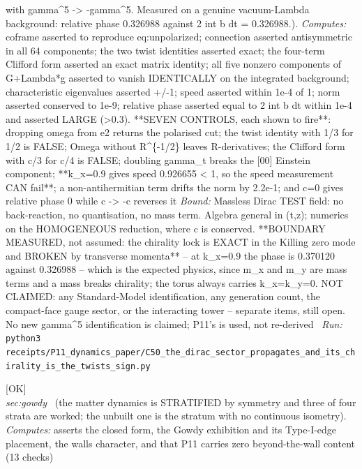 \begin{description}
with gamma\textasciicircum{}5 -> -gamma\textasciicircum{}5. Measured on a genuine vacuum-Lambda background: relative phase 0.326988 against 2 int b dt = 0.326988.). 
\emph{Computes:} coframe asserted to reproduce eq:unpolarized; connection asserted antisymmetric in all 64 components; the two twist identities asserted exact; the four-term Clifford form asserted an exact matrix identity; all five nonzero components of G+Lambda*g asserted to vanish IDENTICALLY on the integrated background; characteristic eigenvalues asserted +/-1; speed asserted within 1e-4 of 1; norm asserted conserved to 1e-9; relative phase asserted equal to 2 int b dt within 1e-4 and asserted LARGE (>0.3). **SEVEN CONTROLS, each shown to fire**: dropping omega from e2 returns the polarised cut; the twist identity with 1/3 for 1/2 is FALSE; Omega without R\textasciicircum{}\{-1/2\} leaves R-derivatives; the Clifford form with c/3 for c/4 is FALSE; doubling gamma\_t breaks the [00] Einstein component; **k\_x=0.9 gives speed 0.926655 < 1, so the speed measurement CAN fail**; a non-antihermitian term drifts the norm by 2.2e-1; and c=0 gives relative phase 0 while c -> -c reverses it
 \emph{Bound:} Massless Dirac TEST field: no back-reaction, no quantisation, no mass term. Algebra general in (t,z); numerics on the HOMOGENEOUS reduction, where c is conserved. **BOUNDARY MEASURED, not assumed: the chirality lock is EXACT in the Killing zero mode and BROKEN by transverse momenta** -- at k\_x=0.9 the phase is 0.370120 against 0.326988 -- which is the expected physics, since m\_x and m\_y are mass terms and a mass breaks chirality; the torus always carries k\_x=k\_y=0. NOT CLAIMED: any Standard-Model identification, any generation count, the compact-face gauge sector, or the interacting tower -- separate items, still open. No new gamma\textasciicircum{}5 identification is claimed; P11's is used, not re-derived
\ \emph{Run:} \texttt{python3 receipts/P11\_dynamics\_paper/C50\_the\_dirac\_sector\_propagates\_and\_its\_chirality\_is\_the\_twists\_sign.py}
\item[\label{rcpt:I2_the_stratification_three_of_four_are_worked}\textbf{}\quad\texttt{I2\_the\_stratification\_three\_of\_four\_are\_worked}]\hfill\textsf{[OK]}\\
\textit{sec:gowdy} \ (the matter dynamics is STRATIFIED by symmetry and three of four strata are worked; the unbuilt one is the stratum with no continuous isometry). 
\emph{Computes:} asserts the closed form, the Gowdy exhibition and its Type-I-edge placement, the walls character, and that P11 carries zero beyond-the-wall content (13 checks)

\end{description}

